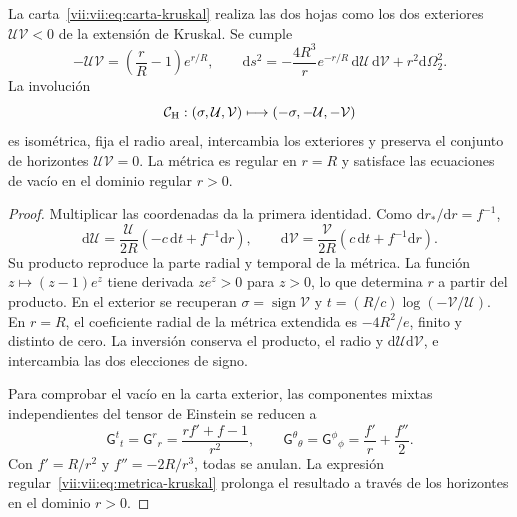 \begin{theorem}
\label{vii:vii:thm:kruskal-hojas}
La carta~\eqref{vii:vii:eq:carta-kruskal} realiza las dos hojas como los
dos exteriores \(\mathcal U\mathcal V<0\) de la extensión de
Kruskal. Se cumple
\begin{equation}
 -\mathcal U\mathcal V=\left(\frac rR-1\right)e^{r/R},\qquad
 \mathrm ds^2=-\frac{4R^3}{r}e^{-r/R}\,
                    \mathrm d\mathcal U\,\mathrm d\mathcal V
                    +r^2\mathrm d\Omega_2^2.
 \label{vii:vii:eq:metrica-kruskal}
\end{equation}
La involución
\begin{equation}
 \mathcal C_{\rm H}:(\sigma,\mathcal U,\mathcal V)
 \longmapsto(-\sigma,-\mathcal U,-\mathcal V)
 \label{vii:vii:eq:involucion-horizonte}
\end{equation}
es isométrica, fija el radio areal, intercambia los exteriores y preserva
el conjunto de horizontes \(\mathcal U\mathcal V=0\).
La métrica es regular en \(r=R\) y satisface las ecuaciones de vacío
en el dominio regular \(r>0\).
\end{theorem}
\begin{proof}
Multiplicar las coordenadas da la primera identidad. Como
\(\mathrm dr_*/\mathrm dr=f^{-1}\),
\[
 \mathrm d\mathcal U=\frac{\mathcal U}{2R}
            (-c\,\mathrm dt+f^{-1}\mathrm dr),\qquad
 \mathrm d\mathcal V=\frac{\mathcal V}{2R}
            ( c\,\mathrm dt+f^{-1}\mathrm dr).
\]
Su producto reproduce la parte radial y temporal de la métrica.
La función \(z\mapsto(z-1)e^z\) tiene derivada \(ze^z>0\)
para \(z>0\), lo que determina \(r\) a partir del producto.
En el exterior se recuperan
\(\sigma=\operatorname{sign}\mathcal V\) y
\(t=(R/c)\log(-\mathcal V/\mathcal U)\).
En \(r=R\), el coeficiente radial de la métrica extendida es
\(-4R^2/e\), finito y distinto de cero. La inversión conserva el
producto, el radio y \(\mathrm d\mathcal U\mathrm d\mathcal V\),
e intercambia las dos elecciones de signo.

Para comprobar el vacío en la carta exterior, las componentes mixtas
independientes del tensor de Einstein se reducen a
\[
 \mathsf G^t{}_t=\mathsf G^r{}_r
 =\frac{rf'+f-1}{r^2},\qquad
 \mathsf G^\theta{}_\theta=\mathsf G^\phi{}_\phi
 =\frac{f'}r+\frac{f''}2.
\]
Con \(f'=R/r^2\) y \(f''=-2R/r^3\), todas se anulan.
La expresión regular~\eqref{vii:vii:eq:metrica-kruskal} prolonga el
resultado a través de los horizontes en el dominio \(r>0\).
\end{proof}

